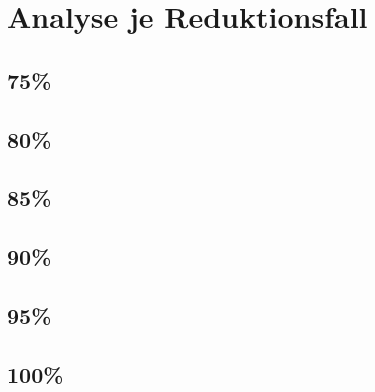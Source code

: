 \section{Analyse je Reduktionsfall}

\subsection{75\%}

\subsection{80\%}

\subsection{85\%}

\subsection{90\%}

\subsection{95\%}

\subsection{100\%}
%